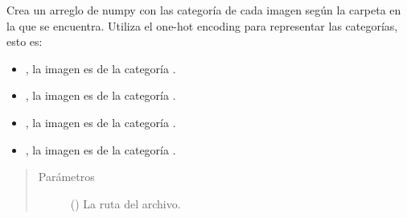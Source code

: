 \begin{fulllineitems}
\label{\detokenize{model_desc:cnn_indoor_classifier_model.get_labels_from_path}}
Crea un arreglo de numpy con las categoría de
cada imagen según la carpeta en la que se encuentra.
Utiliza el one-hot encoding para representar
las categorías, esto es:
\begin{itemize}
\item {} 
\sphinxcode{\sphinxupquote{{[}1, 0, 0, 0{]}}}, la imagen es de la categoría .

\item {} 
\sphinxcode{\sphinxupquote{{[}0, 1, 0, 0{]}}}, la imagen es de la categoría .

\item {} 
\sphinxcode{\sphinxupquote{{[}0, 0, 1, 0{]}}}, la imagen es de la categoría .

\item {} 
\sphinxcode{\sphinxupquote{{[}0, 0, 0, 1{]}}}, la imagen es de la categoría .

\end{itemize}
\begin{quote}\begin{description}
\item[{Parámetros}] \leavevmode
{} () \textendash{} La ruta del archivo.

\end{description}\end{quote}

\end{fulllineitems}


